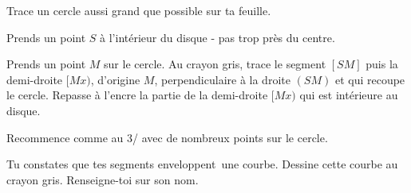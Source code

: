 \begin{myenumerate}
  \item Trace un cercle aussi grand que possible sur ta feuille.
  \item Prends un point $S$ à l'intérieur du disque - pas trop près du
    centre.
  \item Prends un point $M$ sur le cercle. Au crayon gris, trace le
    segment $[SM]$ puis la demi-droite $[Mx)$, d'origine $M$,
    perpendiculaire à la droite $(SM)$ et qui recoupe le
    cercle. Repasse à l'encre la partie de la demi-droite $[Mx)$ qui
    est intérieure au disque.
  \item Recommence comme au 3/ avec de nombreux points sur le cercle.
  \item Tu constates que tes segments \og enveloppent\fg\ une
    courbe. Dessine cette courbe au crayon gris. Renseigne-toi sur son
    nom.
\end{myenumerate}